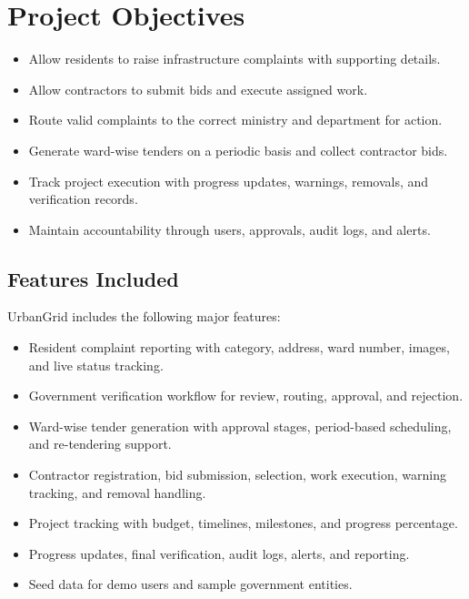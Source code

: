 \documentclass[12pt,a4paper,oneside,openany]{report}
\begin{document}
\chapter*{Project Objectives}
{}
\begin{itemize}[leftmargin=*]

  \item Allow residents to raise infrastructure complaints with supporting details.
  \item Allow contractors to submit bids and execute assigned work.
  \item Route valid complaints to the correct ministry and department for action.
  \item Generate ward-wise tenders on a periodic basis and collect contractor bids.
  \item Track project execution with progress updates, warnings, removals, and verification records.
  \item Maintain accountability through users, approvals, audit logs, and alerts.
\end{itemize}

\section*{Features Included}

UrbanGrid includes the following major features:
\begin{itemize}[leftmargin=*]

  \item Resident complaint reporting with category, address, ward number, images, and live status tracking.
  \item Government verification workflow for review, routing, approval, and rejection.
  \item Ward-wise tender generation with approval stages, period-based scheduling, and re-tendering support.
  \item Contractor registration, bid submission, selection, work execution, warning tracking, and removal handling.
  \item Project tracking with budget, timelines, milestones, and progress percentage.
  \item Progress updates, final verification, audit logs, alerts, and reporting.
  \item Seed data for demo users and sample government entities.
\end{itemize}
\end{document}
